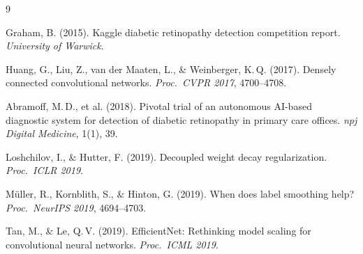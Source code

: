 \documentclass[a4paper, 10pt, twocolumn]{article}
\begin{document}
\renewcommand{\refname}{\normalfont\bfseries\small\color{accent}References}
\begin{thebibliography}{9}
\small\setlength{\itemsep}{1pt}

Graham, B. (2015).
Kaggle diabetic retinopathy detection competition report.
\textit{University of Warwick}.

Huang, G., Liu, Z., van der Maaten, L., \& Weinberger, K.\,Q. (2017).
Densely connected convolutional networks.
\textit{Proc.\ CVPR 2017}, 4700--4708.

Abramoff, M.\,D., et al. (2018).
Pivotal trial of an autonomous AI-based diagnostic system for detection of
diabetic retinopathy in primary care offices.
\textit{npj Digital Medicine}, 1(1), 39.

Loshchilov, I., \& Hutter, F. (2019).
Decoupled weight decay regularization.
\textit{Proc.\ ICLR 2019}.

Müller, R., Kornblith, S., \& Hinton, G. (2019).
When does label smoothing help?
\textit{Proc.\ NeurIPS 2019}, 4694--4703.

Tan, M., \& Le, Q.\,V. (2019).
EfficientNet: Rethinking model scaling for convolutional neural networks.
\textit{Proc.\ ICML 2019}.

\end{thebibliography}
\end{document}
